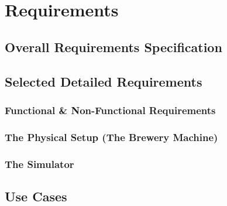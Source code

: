\section{Requirements}

\subsection{Overall Requirements Specification}

\subsection{Selected Detailed Requirements}

\subsubsection{Functional \& Non-Functional Requirements}

\subsubsection{The Physical Setup (The Brewery Machine)}

\subsubsection{The Simulator}


\subsection{Use Cases}

